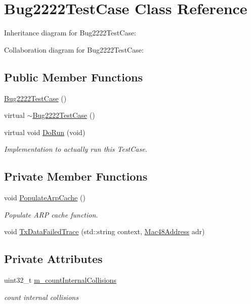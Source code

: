 \hypertarget{classBug2222TestCase}{}\section{Bug2222\+Test\+Case Class Reference}
\label{classBug2222TestCase}


Inheritance diagram for Bug2222\+Test\+Case\+:


Collaboration diagram for Bug2222\+Test\+Case\+:
\subsection*{Public Member Functions}
\begin{DoxyCompactItemize}
\item 
\hyperlink{classBug2222TestCase_a535dbfdf04ea951ab4adc7f1d6cd632e}{Bug2222\+Test\+Case} ()
\item 
virtual \hyperlink{classBug2222TestCase_aebef44087e2708c96adc6b1f2de91368}{$\sim$\+Bug2222\+Test\+Case} ()
\item 
virtual void \hyperlink{classBug2222TestCase_a5e36f50efb283abb1802a04946d11bd0}{Do\+Run} (void)
\begin{DoxyCompactList}\small\item\em Implementation to actually run this Test\+Case. \end{DoxyCompactList}\end{DoxyCompactItemize}
\subsection*{Private Member Functions}
\begin{DoxyCompactItemize}
\item 
void \hyperlink{classBug2222TestCase_ae579afd0be5024c19eb04915420b146c}{Populate\+Arp\+Cache} ()
\begin{DoxyCompactList}\small\item\em Populate A\+RP cache function. \end{DoxyCompactList}\item 
void \hyperlink{classBug2222TestCase_a6ccf3e7c5a9de570c50ad848d86f3f9d}{Tx\+Data\+Failed\+Trace} (std\+::string context, \hyperlink{classns3_1_1Mac48Address}{Mac48\+Address} adr)
\end{DoxyCompactItemize}
\subsection*{Private Attributes}
\begin{DoxyCompactItemize}
\item 
uint32\+\_\+t \hyperlink{classBug2222TestCase_a0459c1e5f762d2ef06af67617cb4fb5f}{m\+\_\+count\+Internal\+Collisions}
\begin{DoxyCompactList}\small\item\em count internal collisions \end{DoxyCompactList}\end{DoxyCompactItemize}
